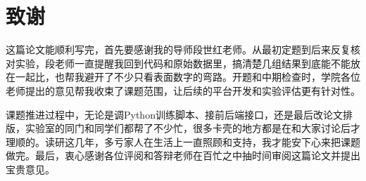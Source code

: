 \chapter*{致\quad\quad 谢}

这篇论文能顺利写完，首先要感谢我的导师段世红老师。从最初定题到后来反复核对实验，段老师一直提醒我回到代码和原始数据里，搞清楚几组结果到底能不能放在一起比，也帮我避开了不少只看表面数字的弯路。开题和中期检查时，学院各位老师提出的意见帮我收束了课题范围，让后续的平台开发和实验评估更有针对性。

课题推进过程中，无论是调Python训练脚本、接前后端接口，还是最后改论文排版，实验室的同门和同学们都帮了不少忙，很多卡壳的地方都是在和大家讨论后才理顺的。读研这几年，多亏家人在生活上一直照顾和支持，我才能安下心来把课题做完。最后，衷心感谢各位评阅和答辩老师在百忙之中抽时间审阅这篇论文并提出宝贵意见。
